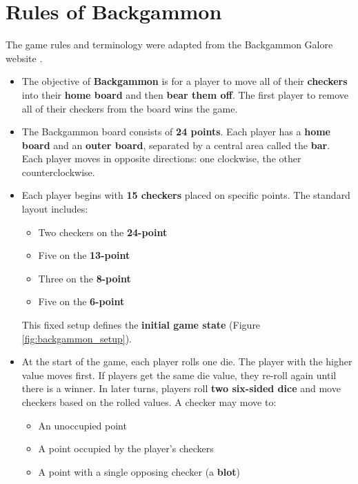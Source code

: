 \section*{Rules of Backgammon}
The game rules and terminology were adapted from the Backgammon Galore website \cite{rules}.

\begin{itemize}
    \item The objective of \textbf{Backgammon} is for a player to move all of their \textbf{checkers} into their \textbf{home board} and then \textbf{bear them off}. The first player to remove all of their checkers from the board wins the game.
    
    \item The Backgammon board consists of \textbf{24 points}. Each player has a \textbf{home board} and an \textbf{outer board}, separated by a central area called the \textbf{bar}. Each player moves in opposite directions: one clockwise, the other counterclockwise.
    
    \item Each player begins with \textbf{15 checkers} placed on specific points. The standard layout includes:
    \begin{itemize}
        \item Two checkers on the \textbf{24-point}
        \item Five on the \textbf{13-point}
        \item Three on the \textbf{8-point}
        \item Five on the \textbf{6-point}
    \end{itemize}
    This fixed setup defines the \textbf{initial game state} (Figure \ref{fig:backgammon_setup}).
    
    \item At the start of the game, each player rolls one die. The player with the higher value moves first. If players get the same die value, they re-roll again until there is a winner. In later turns, players roll \textbf{two six-sided dice} and move checkers based on the rolled values. A checker may move to:
    \begin{itemize}
        \item An unoccupied point
        \item A point occupied by the player's checkers
        \item A point with a single opposing checker (a \textbf{blot})
    \end{itemize}
    

\end{itemize}
